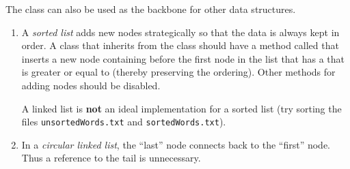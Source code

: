 The  class can also be used as the backbone for other data structures.
%
\begin{enumerate}
\item A \emph{sorted list} adds new nodes strategically so that the data is always kept in order.
A  class that inherits from the  class should have a method called  that inserts a new node containing  before the first node in the list that has a  that is greater or equal to  (thereby preserving the ordering).
Other methods for adding nodes should be disabled.

A linked list is \textbf{not} an ideal implementation for a sorted list (try sorting the files \texttt{unsortedWords.txt} and \texttt{sortedWords.txt}).

\item In a \emph{circular linked list}, the ``last'' node connects back to the ``first'' node.
Thus a reference to the tail is unnecessary.
\end{enumerate}

